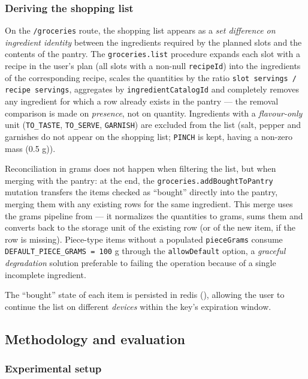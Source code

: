 \subsubsection{Deriving the shopping list}\label{subsec:lista-cumparaturi}

On the \texttt{/groceries} route, the shopping list appears as a \textit{set difference on ingredient identity} between the ingredients required by the planned slots and the contents of the pantry. The \texttt{groceries.list} procedure expands each slot with a recipe in the user's plan (all slots with a non-null \texttt{recipeId}) into the ingredients of the corresponding recipe, scales the quantities by the ratio \texttt{slot servings / recipe servings}, aggregates by \texttt{ingredientCatalogId} and completely removes any ingredient for which a row already exists in the pantry --- the removal comparison is made on \textit{presence}, not on quantity. Ingredients with a \textit{flavour-only} unit (\texttt{TO\_TASTE}, \texttt{TO\_SERVE}, \texttt{GARNISH}) are excluded from the list (salt, pepper and garnishes do not appear on the shopping list; \texttt{PINCH} is kept, having a non-zero mass (0.5 g)).

Reconciliation in grams does not happen when filtering the list, but when merging with the pantry: at the end, the \texttt{groceries.addBoughtToPantry} mutation transfers the items checked as “bought” directly into the pantry, merging them with any existing rows for the same ingredient. This merge uses the grams pipeline from  --- it normalizes the quantities to grams, sums them and converts back to the storage unit of the existing row (or of the new item, if the row is missing). Piece-type items without a populated \texttt{pieceGrams} consume \texttt{DEFAULT\_PIECE\_GRAMS = 100} g through the \texttt{allowDefault} option, a \textit{graceful degradation} solution preferable to failing the operation because of a single incomplete ingredient.

The “bought” state of each item is persisted in \gls{redis} (), allowing the user to continue the list on different \textit{devices} within the key's expiration window.

\subsection{Methodology and evaluation}\label{ch:evaluare}

\subsubsection{Experimental setup}\label{subsec:setare-experimentala}

